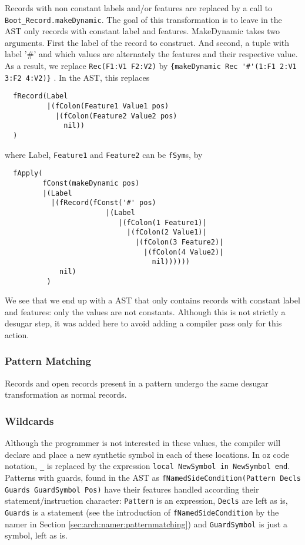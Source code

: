 \documentclass[a4paper]{memoir}
\begin{document}
Records with non constant labels and/or features are replaced by a call to \lstinline!Boot_Record.makeDynamic!. The goal of this transformation is to leave in the AST only records with constant label and features. MakeDynamic takes two arguments. First the label of the record to construct. And second, a tuple with label '\#' and which values are alternately the features and their respective value. As a result, we replace \lstinline!Rec(F1:V1 F2:V2)! by \lstinline!{makeDynamic Rec '#'(1:F1 2:V1 3:F2 4:V2)}! .
In the AST, this replaces 
\begin{lstlisting}
  fRecord(Label 
          |(fColon(Feature1 Value1 pos)
            |(fColon(Feature2 Value2 pos)
              nil))
  )
\end{lstlisting}
where Label, \lstinline!Feature1! and \lstinline!Feature2! can be
\lstinline!fSym!s, by
\begin{lstlisting}
  fApply(
         fConst(makeDynamic pos) 
         |(Label
           |(fRecord(fConst('#' pos) 
                        |(Label
                           |(fColon(1 Feature1)|
                             |(fColon(2 Value1)|
                               |(fColon(3 Feature2)|
                                 |(fColon(4 Value2)|
                                   nil))))))
             nil)
          )
\end{lstlisting}
We see that we end up with a AST that only contains records with constant label and features: only the values are not constants.
Although this is not strictly a desugar step, it was added here to avoid adding a compiler pass only for this action.
\subsubsection{Pattern Matching}
Records and open records present in a pattern undergo the same desugar
transformation as normal records.
\subsubsection{Wildcards}
Although the programmer is not interested in these values, the compiler will declare and place a new synthetic symbol in each of these locations. In oz code notation, \lstinline!_! is replaced by the expression \lstinline!local NewSymbol in NewSymbol end!.
Patterns with guards, found in the AST as \lstinline!fNamedSideCondition(Pattern Decls Guards GuardSymbol Pos)! 
have their features handled according their statement/instruction character:
\lstinline!Pattern! is an expression, \lstinline!Decls! are left as is,
\lstinline!Guards! is a statement (see the introduction
of \lstinline!fNamedSideCondition! by the namer in Section
\ref{sec:arch:namer:patternmatching}) and \lstinline!GuardSymbol! is just a
symbol, left as is.
\end{document}
